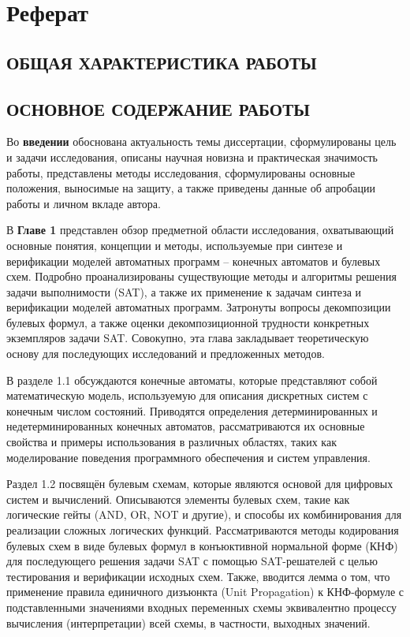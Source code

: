 \chapter*{Реферат}

\section*{ОБЩАЯ ХАРАКТЕРИСТИКА РАБОТЫ}




\section*{ОСНОВНОЕ СОДЕРЖАНИЕ РАБОТЫ}

Во \textbf{введении} обоснована актуальность темы диссертации, сформулированы цель и задачи исследования, описаны научная новизна и практическая значимость работы, представлены методы исследования, сформулированы основные положения, выносимые на защиту, а также приведены данные об апробации работы и личном вкладе автора.


В \textbf{Главе 1} представлен обзор предметной области исследования, охватывающий основные понятия, концепции и методы, используемые при синтезе и верификации моделей автоматных программ \--- конечных автоматов и булевых схем.
Подробно проанализированы существующие методы и алгоритмы решения задачи выполнимости (SAT), а также их применение к задачам синтеза и верификации моделей автоматных программ.
Затронуты вопросы декомпозиции булевых формул, а также оценки декомпозиционной трудности конкретных экземпляров задачи SAT.
Совокупно, эта глава закладывает теоретическую основу для последующих исследований и предложенных методов.

В разделе 1.1 обсуждаются конечные автоматы, которые представляют собой математическую модель, используемую для описания дискретных систем с конечным числом состояний.
Приводятся определения детерминированных и недетерминированных конечных автоматов, рассматриваются их основные свойства и примеры использования в различных областях, таких как моделирование поведения программного обеспечения и систем управления.

Раздел 1.2 посвящён булевым схемам, которые являются основой для цифровых систем и вычислений.
Описываются элементы булевых схем, такие как логические гейты (AND, OR, NOT и другие), и способы их комбинирования для реализации сложных логических функций.
Рассматриваются методы кодирования булевых схем в виде булевых формул в конъюктивной нормальной форме (КНФ) для последующего решения задачи SAT с помощью SAT-решателей с целью тестирования и верификации исходных схем.
Также, вводится лемма о том, что применение правила единичного дизъюнкта (Unit Propagation) к КНФ-формуле с подставленными значениями входных переменных схемы эквивалентно процессу вычисления (интерпретации) всей схемы, в частности, выходных значений.

